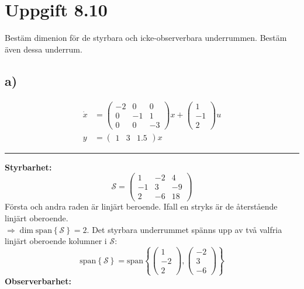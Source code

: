 \documentclass[12pt]{article}
\newcommand{\sspan}[1]{\mathrm{span}\left\{#1\right\}}
\newcommand{\qline}{\hrule \vspace*{10pt}}
\begin{document}
\section*{Uppgift 8.10}
Bestäm dimenion för de styrbara och icke-observerbara underrummen. Bestäm även dessa underrum.

\subsection*{a)}
\begin{align*}
  \dot{x} &=
            \begin{pmatrix}
              -2 & 0 & 0 \\
              0 & -1 & 1 \\
              0 & 0 & -3
            \end{pmatrix}x +
                      \begin{pmatrix}
                        1 \\
                        -1 \\
                        2
                      \end{pmatrix}u \\
  y &=
      \begin{pmatrix}
        1 & 3 & 1.5
      \end{pmatrix}x
\end{align*}
\qline
\textbf{Styrbarhet:}
\[\mathcal{S} =
\begin{pmatrix}
  1 & -2 & 4 \\
  -1 & 3 & -9 \\
  2 & -6 & 18
\end{pmatrix}\]
Första och andra raden är linjärt beroende. Ifall en stryks är de återstående linjärt oberoende.\\
$\Rightarrow \dim{\sspan{\mathcal{S}}} = 2$.
Det styrbara underrummet spänns upp av två valfria linjärt oberoende kolumner i $\mathcal{S}$:
\begin{equation*}
  \sspan{\mathcal{S}} = \sspan{
    \begin{pmatrix}
      1 \\
      -2 \\
      2
    \end{pmatrix},
    \begin{pmatrix}
      -2 \\
      3 \\
      -6
    \end{pmatrix}}
\end{equation*}
\textbf{Observerbarhet:}
\end{document}
